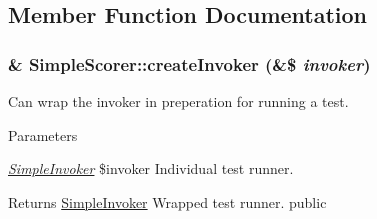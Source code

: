 \subsection{Member Function Documentation}
\hypertarget{class_simple_scorer_a14b49e85d21162afc6f46f98220ad043}{
\subsubsection[{createInvoker}]{\setlength{\rightskip}{0pt plus 5cm}\& SimpleScorer::createInvoker (\&\$ {\em invoker})}}
\label{class_simple_scorer_a14b49e85d21162afc6f46f98220ad043}
Can wrap the invoker in preperation for running a test. 
\begin{DoxyParams}{Parameters}
\item[{\em \hyperlink{class_simple_invoker}{SimpleInvoker}}]\$invoker Individual test runner. \end{DoxyParams}
\begin{DoxyReturn}{Returns}
\hyperlink{class_simple_invoker}{SimpleInvoker} Wrapped test runner.  public 
\end{DoxyReturn}


